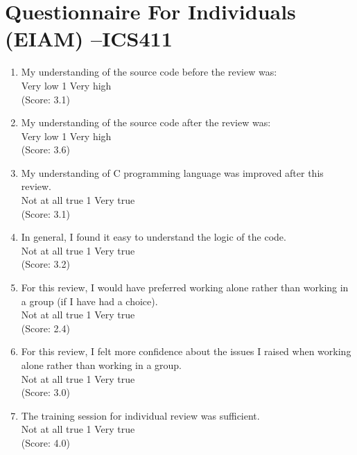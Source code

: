 

\chapter {Questionnaire For Individuals (EIAM) --ICS411}

\begin{enumerate}

\item  My understanding of the source code before the review was: 
\\
Very low \hfill 1     \hfill Very high\\
(Score: 3.1)

\item  My understanding of the source code after the review was: 
\\
Very low \hfill 1     \hfill
Very high\\
(Score: 3.6)

\item  My understanding of C programming language was improved after
this review.  
\\
Not at all true \hfill 1     \hfill Very true\\
(Score: 3.1)

\item  In general, I found it easy to understand the logic of
the code. 
\\
Not at all true \hfill 1     \hfill Very true\\
(Score: 3.2)

\item  For this review, I would have preferred working alone rather 
than working in a group (if I have had a choice).
\\
Not at all true \hfill 1     \hfill Very true\\
(Score: 2.4)

\item  For this review, I felt more confidence about the issues I raised when 
working alone rather than working in a group.
\\
Not at all true \hfill 1     \hfill Very true\\
(Score: 3.0)

\item  The training session for individual review was sufficient.
\\
Not at all true \hfill 1     \hfill Very true\\
(Score: 4.0)


\end{enumerate}
